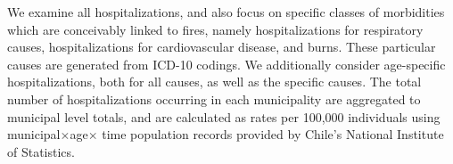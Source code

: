 \documentclass[11pt]{article}
\begin{document}
\begin{spacing}{1.3}
We examine all hospitalizations, and also focus on specific classes of morbidities which are conceivably linked to fires, namely hospitalizations for respiratory causes, hospitalizations for cardiovascular disease, and burns.  These particular causes are generated from ICD-10 codings. We additionally consider age-specific hospitalizations, both for all causes, as well as the specific causes.  The total number of hospitalizations occurring in each municipality are aggregated to municipal level totals, and are calculated as rates per 100,000 individuals using municipal$\times$age$\times$ time population records provided by Chile's National Institute of Statistics. 




\end{spacing}
\end{document}
